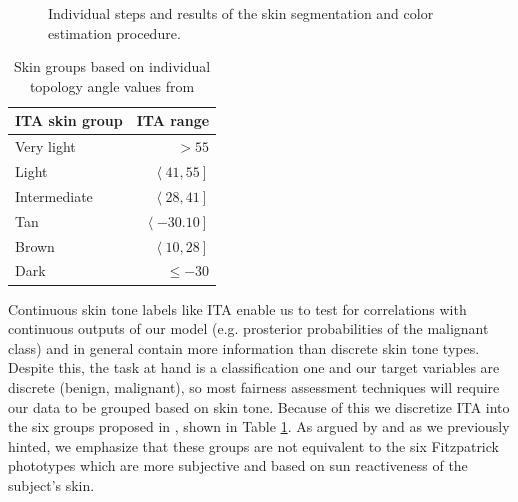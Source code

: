 \begin{figure}[p]
\begin{subfigure}{0.90\textwidth}
         \caption{}
         \label{fig:ss_5}
		 \vspace{0.5em}
     \end{subfigure}
     \hfill
	\caption{Individual steps and results of the skin segmentation and color estimation procedure.}
	\label{fig:skin_segmentation}
\end{figure}

\begin{table}[]
\centering
\caption{Skin groups based on individual topology angle values from \cite{chardon}}
\label{tab:ita_ranges}
\begin{tabular}{lr}
\toprule
\textbf{ITA skin group} & \textbf{ITA range}  \\ \midrule
Very light              & $ > 55 $              \\
Light                   & $ \left<41, 55\right]$ \\
Intermediate            & $ \left<28, 41\right]$ \\
Tan                     & $ \left<-30.10\right]$ \\
Brown                   & $ \left<10, 28\right]$ \\
Dark                    & $ \le -30 $           \\ \bottomrule
\end{tabular}
\end{table}


Continuous skin tone labels like ITA enable us to test for correlations with continuous outputs of our model (e.g. prosterior probabilities of the malignant class) and in general contain more information than discrete skin tone types. Despite this, the task at hand is a classification one and our target variables are discrete (benign, malignant), so most fairness assessment techniques will require our data to be grouped based on skin tone. Because of this we discretize ITA into the six groups proposed in \cite{chardon}, shown in Table \ref{tab:ita_ranges}. As argued by \cite{letter_ita_fp} and as we previously hinted, we emphasize that these groups are not equivalent to the six Fitzpatrick phototypes which are more subjective and based on sun reactiveness of the subject's skin.

